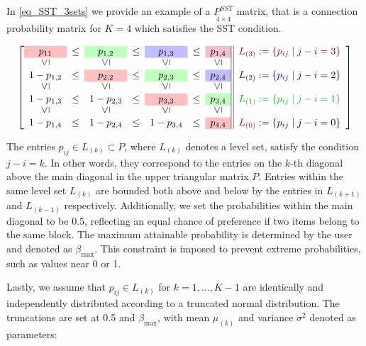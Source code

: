 \documentclass[11pt]{amsart}
\newcommand{\vertgeq}{\rotatebox{90}{$\leq$}}
\begin{document}
In \eqref{eq_SST_3sets} we provide an example of a $\underset{4\times4}{P^{SST }}$ matrix, that is a connection probability matrix for $K=4$ which satisfies the SST condition.

\vspace{.5cm}
\begin{equation}
\left[
\begin{array}{ccccccc||c}
\cellcolor{red!25} p_{11} &\leq & \cellcolor{green!25} p_{1,2} &\leq & \cellcolor{blue!25} p_{1,3} &\leq & \cellcolor{purple!25} p_{1,4} & \textcolor{purple!70!black}{L_{(3)} := \{p_{ij} \mid j-i = 3\}}\\
\vertgeq  & &\vertgeq  & & \vertgeq  & & \vertgeq  &\\
1-p_{1,2}&\leq & \cellcolor{red!25} p_{2,2} &\leq & \cellcolor{green!25} p_{2,3} &\leq & \cellcolor{blue!25} p_{2,4} &\textcolor{blue!70!black}{L_{(2)} := \{p_{ij} \mid j-i = 2\}}\\
\vertgeq  & &\vertgeq  & & \vertgeq &  & \vertgeq & \\
1-p_{1,3} &\leq &  1-p_{2,3} &\leq & \cellcolor{red!25} p_{3,3} &\leq & \cellcolor{green!25} p_{3,4} &\textcolor{green!70!black}{L_{(1)} := \{p_{ij} \mid j-i = 1\}}\\
\vertgeq  & &\vertgeq  & & \vertgeq  & & \vertgeq  &\\
1-p_{1,4} &\leq &  1-p_{2,4}& \leq &  1-p_{3,4}& \leq & \cellcolor{red!25} p_{4,4} &\textcolor{red!70!black}{L_{(0)}} := \{p_{ij} \mid j-i = 0\}\\
\end{array}\right]  
\label{eq_SST_3sets}
\end{equation}

\vspace{.5cm}

The entries \(p_{ij} \in L_{(k)} \subset P\), where \(L_{(k)}\) denotes a level set, satisfy the condition \(j - i = k\). In other words, they correspond to the entries on the \(k\)-th diagonal above the main diagonal in the upper triangular matrix \(P\). Entries within the same level set \(L_{(k)}\) are bounded both above and below by the entries in \(L_{(k+1)}\) and \(L_{(k-1)}\) respectively. Additionally, we set the probabilities within the main diagonal to be 0.5, reflecting an equal chance of preference if two items belong to the same block. The maximum attainable probability is determined by the user and denoted as \(\beta_{\max}\). This constraint is imposed to prevent extreme probabilities, such as values near 0 or 1.

Lastly, we assume that \(p_{ij} \in L_{(k)}\) for \(k = 1, \ldots, K-1\) are identically and independently distributed according to a truncated normal distribution. The truncations are set at 0.5 and \(\beta_{\max}\), with mean \(\mu_{(k)}\) and variance \(\sigma^2\) denoted as parameters:
\end{document}
